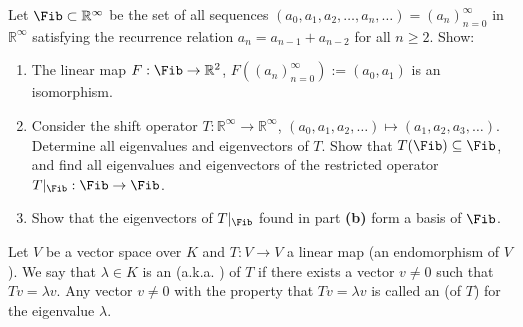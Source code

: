 \begin{exercise}
  \label{exc:fibonacci_sequence_space_shift_eigenvalues}
  Let $\Fib \subset \mathbb{R}^\infty$ be the set of all sequences $(a_0, a_1, a_2, \dots, a_n, \dots) = (a_n)_{n=0}^\infty$ in $\mathbb{R}^\infty$ satisfying the recurrence relation $a_n = a_{n-1} + a_{n-2}$ for all $n \ge 2$. Show:
  \begin{enumerate}[label=\textbf{(\alph*)}]
    \item The linear map $F : \Fib \to \mathbb{R}^2$, $F((a_n)_{n=0}^\infty) := (a_0, a_1)$ is an isomorphism.
    \item Consider the shift operator $T : \mathbb{R}^\infty \to \mathbb{R}^\infty$, $(a_0, a_1, a_2, \dots) \mapsto (a_1, a_2, a_3, \dots)$. Determine all eigenvalues and eigenvectors of $T$. Show that $T(\Fib) \subseteq \Fib$, and find all eigenvalues and eigenvectors of the restricted operator $T|_{\Fib} : \Fib \to \Fib$.
    \item Show that the eigenvectors of $T|_{\Fib}$ found in part \textbf{(b)} form a basis of $\Fib$.
  \end{enumerate}
\end{exercise}

\begin{definition}\label{def:eigenvalue_eigenvector}
  Let $V$ be a vector space over $K$ and $T: V \rightarrow V$ a linear map (an endomorphism of $V$). We say that $\lambda \in K$ is an  (a.k.a. ) of $T$ if there exists a vector $v \ne 0$ such that $Tv = \lambda v$. Any vector $v \ne 0$ with the property that $Tv = \lambda v$ is called an  (of $T$) for the eigenvalue $\lambda$.
\end{definition}

